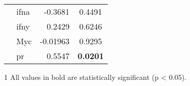 \begin{table}[htpb]
\begin{threeparttable}
\begin{tabular}{llrc}
                                                                           & \gls{ifna} & -0.3681   & 0.4491 \\
                                                                           & \gls{ifny} & 0.2429    & 0.6246 \\
                                                                           & Myc        & -0.01963  & 0.9295 \\
                                                                           & \gls{pr}   & 0.5547    & \bfseries 0.0201  \\
				\hline
				\hline
			\end{tabular}
			\begin{tablenotes}
				\begin{footnotesize}
				\item [1] All values in bold are statistically significant (p \textless{} 0.05).
				\end{footnotesize}
			\end{tablenotes}
		\end{threeparttable}
	\end{table}

